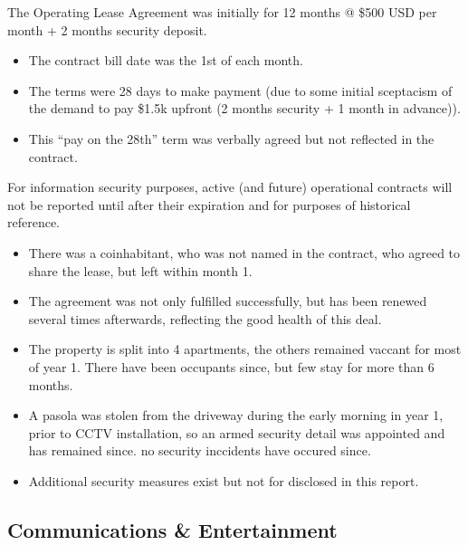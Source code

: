 \documentclass[letterpaper,10pt,openany,oneside,english]{sphinxmanual}
\begin{document}
\sphinxAtStartPar
The Operating Lease Agreement was initially for 12 months @ \$500 USD per month + 2 months security deposit.
\begin{itemize}
\item {} 
\sphinxAtStartPar
The contract bill date was the 1st of each month.

\item {} 
\sphinxAtStartPar
The terms were 28 days to make payment (due to some initial sceptacism of the demand to pay \$1.5k upfront (2 months security + 1 month in advance)).

\item {} 
\sphinxAtStartPar
This “pay on the 28th” term was verbally agreed but not reflected in the contract.

\end{itemize}

\sphinxAtStartPar
For information security purposes, active (and future) operational contracts will not be reported until after their expiration and for purposes of historical reference.

\sphinxAtStartPar
{}
\begin{itemize}
\item {} 
\sphinxAtStartPar
There was a co\sphinxhyphen{}inhabitant, who was not named in the contract, who agreed to share the lease, but left within month 1.

\item {} 
\sphinxAtStartPar
The agreement was not only fulfilled successfully, but has been renewed several times afterwards, reflecting the good health of this deal.

\item {} 
\sphinxAtStartPar
The property is split into 4 apartments, the others remained vaccant for most of year 1. There have been occupants since, but few stay for more than 6 months.

\item {} 
\sphinxAtStartPar
A pasola was stolen from the driveway during the early morning in year 1, prior to CCTV installation, so an armed security detail was appointed and has remained since. no security inccidents have occured since.

\item {} 
\sphinxAtStartPar
Additional security measures exist but not for disclosed in this report.

\end{itemize}


\subsection{Communications \& Entertainment}
\label{\detokenize{categories:communications-entertainment}}
\end{document}
